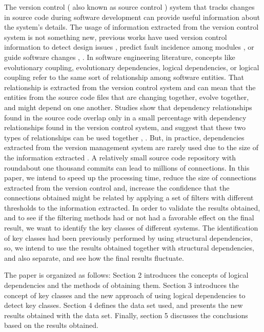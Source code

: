 \documentclass[runningheads]{comsis2}
\begin{document}
The version control ( also known as source control ) system that tracks changes in source code during software development can provide useful information about the system's details. 
The usage of information extracted from the version control system is not something new, previous works have used version control information to detect design issues \cite{Zimmermann:2004:MVH:998675.999460}, predict fault incidence among modules \cite{Predictingfaultincidence}, \cite{Cataldo2009SoftwareDW} or guide software changes \cite{4815274}, \cite{DBLP:journals/ese/AjienkaCC18}.
In software engineering literature, concepts like evolutionary coupling, evolutionary dependencies, logical dependencies, or logical coupling refer to the same sort of relationship among software entities. That relationship is extracted from the version control system and can mean that the entities from the source code files that are changing together, evolve together, and might depend on one another. Studies show that dependency relationships found in the source code overlap only in a small percentage with dependency relationships found in the version control system, and suggest that these two types of relationships can be used together \cite{Oliva:2011:ISL:2067853.2068086}, \cite{DBLP:journals/jss/AjienkaC17}. But, in practice, dependencies extracted from the version management system are rarely used due to the size of the information extracted \cite{Shtern:2012:CMS:2332427.2332428}. A relatively small source code repository with roundabout one thousand commits can lead to millions of connections. 
In this paper, we intend to speed up the processing time, reduce the size of connections extracted from the version control and, increase the confidence that the connections obtained might be related by applying a set of filters with different thresholds to the information extracted. 
In order to validate the results obtained, and to see if the filtering methods had or not had a favorable effect on the final result, we want to identify the key classes of different systems. The identification of key classes had been previously performed by using structural dependencies, so,
we intend to use the results obtained together with structural dependencies, and also separate, and see how the final results fluctuate.

The paper is organized as follows: Section 2 introduces the concepts of logical dependencies and the methods of obtaining them. Section 3 introduces the concept of key classes and the new approach of using logical dependencies to detect key classes. Section 4 defines the data set used, and presents the new results obtained with the data set. Finally, section 5 discusses the conclusions based on the results obtained. 
\end{document}
